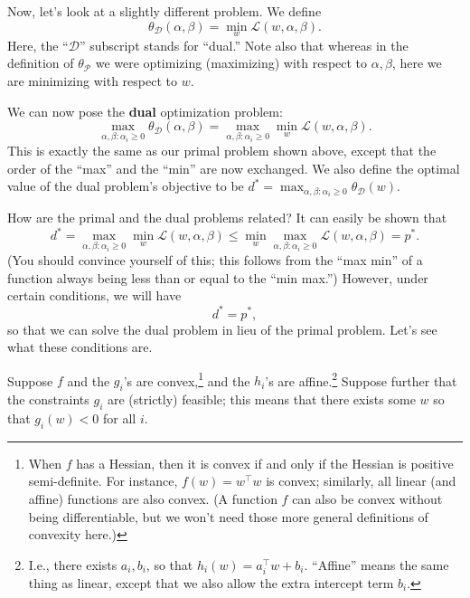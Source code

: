 Now, let's look at a slightly different problem. We define
\begin{equation*}
    \theta_{\mathcal D} (\alpha,\beta) = \min_w \mathcal L(w,\alpha,\beta).
\end{equation*}
Here, the ``$\mathcal D$'' subscript stands for ``dual.'' Note also that whereas in the
definition of $\theta_{\mathcal P}$ we were optimizing (maximizing) with respect to $\alpha,\beta$, here
we are minimizing with respect to $w$.

We can now pose the \textbf{dual} optimization problem:
\begin{equation*}
    \max_{\alpha,\beta :\alpha_i \ge 0} \theta_{\mathcal D} (\alpha,\beta) = \max_{\alpha,\beta :\alpha_i \ge 0} \min_w \mathcal L(w,\alpha,\beta).
\end{equation*}
This is exactly the same as our primal problem shown above, except that the
order of the ``max'' and the ``min'' are now exchanged. We also define the
optimal value of the dual problem's objective to be $d^* = \max_{\alpha,\beta :\alpha_i \ge 0} \theta_{\mathcal D} (w)$.

How are the primal and the dual problems related? It can easily be shown
that
\begin{equation*}
    d^* = \max_{\alpha,\beta :\alpha_i \ge 0} \min_w \mathcal L(w,\alpha,\beta) \le \min_w \max_{\alpha,\beta :\alpha_i \ge 0} \mathcal L(w,\alpha,\beta) = p^*.    
\end{equation*}
(You should convince yourself of this; this follows from the ``max min'' of a
function always being less than or equal to the ``min max.'') However, under
certain conditions, we will have
\begin{equation*}
    d^* = p^*,
\end{equation*}
so that we can solve the dual problem in lieu of the primal problem. Let's
see what these conditions are.

Suppose $f$ and the $g_i$'s are convex,\footnote{
When $f$ has a Hessian, then it is convex if and only if the Hessian is positive semi-definite.
For instance, $f(w) = w^\top w$ is convex; similarly, all linear (and affine) functions
are also convex. (A function $f$ can also be convex without being differentiable, but we
won't need those more general definitions of convexity here.)} and the $h_i$'s are affine.\footnote{
I.e., there exists $a_i , b_i$, so that $h_i (w) = a^\top_i w + b_i$. ``Affine'' means the same thing as
linear, except that we also allow the extra intercept term $b_i$.} Suppose
further that the constraints $g_i$ are (strictly) feasible; this means that there
exists some $w$ so that $g_i (w) < 0$ for all $i$.

